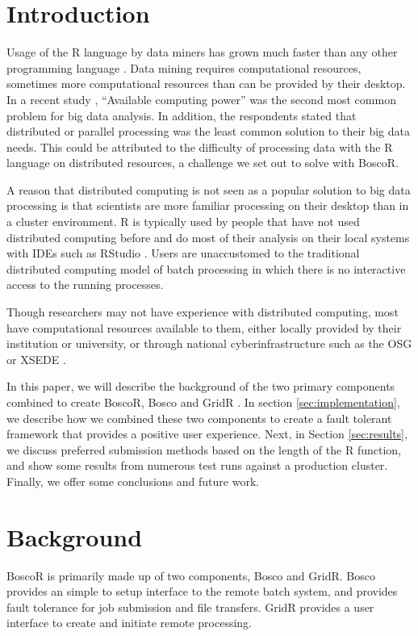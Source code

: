 \documentclass[conference]{IEEEtran}
\begin{document}
\section{Introduction}
Usage of the R language \cite{team2012r} by data miners has grown much faster than any other programming language \cite{rexer2013, KDnuggets2013}.  Data mining requires computational resources, sometimes more computational resources than can be provided by their desktop.  In a recent study \cite{rexer2013}, ``Available computing power'' was the second most common problem for big data analysis.  In addition, the respondents stated that distributed or parallel processing was the least common solution to their big data needs.  This could be attributed to the difficulty of processing data with the R language on distributed resources, a challenge we set out to solve with BoscoR.

A reason that distributed computing is not seen as a popular solution to big data processing is that scientists are more familiar processing on their desktop than in a cluster environment.  R is typically used by people that have not used distributed computing before and do most of their analysis on their local systems with IDEs such as RStudio \cite{racine2012rstudio}.  Users are unaccustomed to the traditional distributed computing model of batch processing in which there is no interactive access to the running processes.

Though researchers may not have experience with distributed computing, most have computational resources available to them, either locally provided by their institution or university, or through national cyberinfrastructure such as the OSG \cite{pordes2007open} or XSEDE \cite{xsede}.



In this paper, we will describe the background of the two primary components combined to create BoscoR, Bosco  \cite{weitzel2014accessing} and GridR  \cite{wegener2007gridr}.  In section \ref{sec:implementation}, we describe how we combined these two components to create a fault tolerant framework that provides a positive user experience.  Next, in Section \ref{sec:results}, we discuss preferred submission methods based on the length of the R function, and show some results from numerous test runs against a production cluster.  Finally, we offer some conclusions and future work.

\section{Background}
BoscoR is primarily made up of two components, Bosco and GridR.  Bosco provides an simple to setup interface to the remote batch system, and provides fault tolerance for job submission and file transfers.  GridR provides a user interface to create and initiate remote processing.
\end{document}
